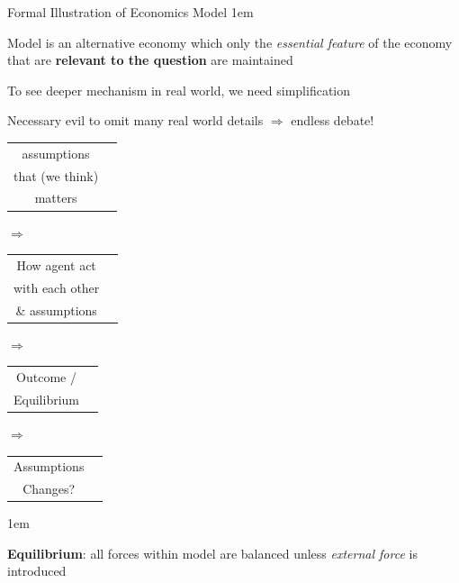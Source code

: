 \documentclass[11pt,aspectratio=43,usenames,dvipsnames]{beamer}
\let\olditemize=\itemize
\let\endolditemize=\enditemize
\renewenvironment{itemize}{\olditemize \itemsep1em}{\endolditemize}
\theoremstyle{definition}
\begin{document}
\begin{frame}{Formal Illustration of Economics Model}
\label{slide:Formal_Illustration_of_Economics_Model}
    \begin{itemize}
        \item Model is an alternative economy which only the \textit{essential feature} of the economy that are \textbf{relevant to the question} are maintained
        \item To see deeper mechanism in real world, we need \alert{simplification}
        \item Necessary evil to omit many real world details $ \Rightarrow  $ endless debate!
    \end{itemize}

    \begin{center}
    \small
    \begin{tabular}{cc}
        \alert{assumptions}
        \\
        that (we think)
        \\
        matters
    \end{tabular}
    $ \Rightarrow  $
    \begin{tabular}{cc}
        How \alert{agent} act
        \\
        with each other
        \\
        \& assumptions
    \end{tabular}
    $ \Rightarrow  $
    \begin{tabular}{cc}
        Outcome /
        \\
        \alert{Equilibrium}
    \end{tabular}
    $ \Rightarrow  $
    \begin{tabular}{cc}
        Assumptions
        \\
        Changes?
    \end{tabular}
    \end{center}

    \begin{itemize}
        \item \textbf{Equilibrium}: all forces within model are \alert{balanced} unless \textit{external force} is introduced
    \end{itemize}
\end{frame}
\end{document}
